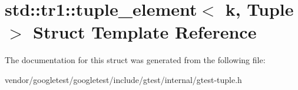 \hypertarget{structstd_1_1tr1_1_1tuple__element}{}\section{std\+:\+:tr1\+:\+:tuple\+\_\+element$<$ k, Tuple $>$ Struct Template Reference}
\label{structstd_1_1tr1_1_1tuple__element}


The documentation for this struct was generated from the following file\+:\begin{DoxyCompactItemize}
\item 
vendor/googletest/googletest/include/gtest/internal/gtest-\/tuple.\+h\end{DoxyCompactItemize}
